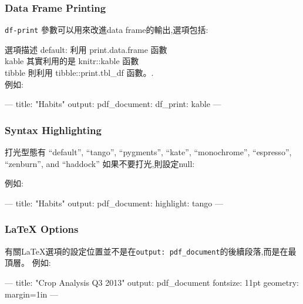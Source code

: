\documentclass[]{book}
\newenvironment{Shaded}{\begin{snugshade}}{\end{snugshade}}
\newcommand{\StringTok}[1]{\textcolor[rgb]{0.31,0.60,0.02}{#1}}
\newcommand{\OtherTok}[1]{\textcolor[rgb]{0.56,0.35,0.01}{#1}}
\newcommand{\FunctionTok}[1]{\textcolor[rgb]{0.00,0.00,0.00}{#1}}
\newcommand{\AttributeTok}[1]{\textcolor[rgb]{0.77,0.63,0.00}{#1}}
\theoremstyle{definition}
\theoremstyle{definition}
\theoremstyle{definition}
\theoremstyle{remark}
\begin{document}
\subsubsection{Data Frame Printing}\label{data-frame-printing}

\texttt{df-print} 參數可以用來改進data frame的輸出,選項包括:

選項描述 default: 利用 print.data.frame 函數\\
kable 其實利用的是 knitr::kable 函數\\
tibble 則利用 tibble::print.tbl\_df 函數。.\\
例如:

\begin{Shaded}
\begin{Highlighting}[]
\OtherTok{---}
\FunctionTok{title:}\AttributeTok{ }\StringTok{"Habits"}
\FunctionTok{output:}
  \FunctionTok{pdf_document:}
    \FunctionTok{df_print:}\AttributeTok{ kable}
\OtherTok{---}
\end{Highlighting}
\end{Shaded}

\subsubsection{Syntax Highlighting}\label{syntax-highlighting}

打光型態有 ``default'', ``tango'', ``pygments'', ``kate'',
``monochrome'', ``espresso'', ``zenburn'', and ``haddock''
如果不要打光,則設定null:

例如:

\begin{Shaded}
\begin{Highlighting}[]
\OtherTok{---}
\FunctionTok{title:}\AttributeTok{ }\StringTok{"Habits"}
\FunctionTok{output:}
  \FunctionTok{pdf_document:}
    \FunctionTok{highlight:}\AttributeTok{ tango}
\OtherTok{---}
\end{Highlighting}
\end{Shaded}

\subsubsection{LaTeX Options}\label{latex-options}

有關LaTeX選項的設定位置並不是在\texttt{output:\ pdf\_document}的後續段落,而是在最頂層。
例如:

\begin{Shaded}
\begin{Highlighting}[]
\OtherTok{---}
\FunctionTok{title:}\AttributeTok{ }\StringTok{"Crop Analysis Q3 2013"}
\FunctionTok{output:}\AttributeTok{ pdf_document}
\FunctionTok{fontsize:}\AttributeTok{ 11pt}
\FunctionTok{geometry:}\AttributeTok{ margin=1in}
\OtherTok{---}
\end{Highlighting}
\end{Shaded}
\end{document}
